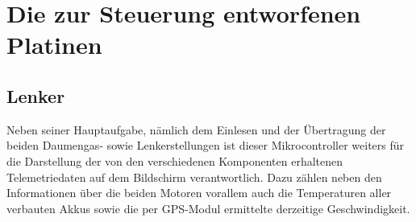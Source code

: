\section{Die zur Steuerung entworfenen Platinen}
\subsection{Lenker}
Neben seiner Hauptaufgabe, nämlich dem Einlesen und der Übertragung der beiden Daumengas- sowie Lenkerstellungen ist dieser Mikrocontroller weiters für die Darstellung der von den verschiedenen Komponenten erhaltenen Telemetriedaten auf dem Bildschirm verantwortlich.
Dazu zählen neben den Informationen über die beiden Motoren vorallem auch die Temperaturen aller verbauten Akkus sowie die per GPS-Modul ermittelte derzeitige Geschwindigkeit.

